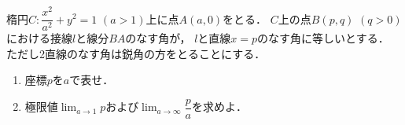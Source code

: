 \documentclass[../../main.tex]{subfiles}
\begin{document}
楕円$\displaystyle C:\dfrac{x^2}{a^2}+y^2=1$ $(a>1)$上に点$A(a,0)$をとる．
$C$上の点$B(p,q)$ $(q>0)$における接線$l$と線分$BA$のなす角が，
$l$と直線$x=p$のなす角に等しいとする．
ただし2直線のなす角は鋭角の方をとることにする．
\begin{enumerate}
  \item 座標$p$を$a$で表せ．
  \item 極限値$\displaystyle \lim_{a \to 1}p$および$\displaystyle \lim_{a \to \infty}\dfrac{p}{a}$を求めよ．
\end{enumerate}
\end{document}
